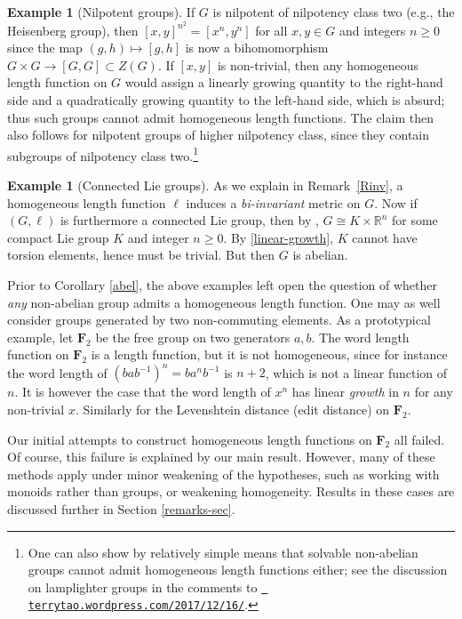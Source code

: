 \documentclass[11pt,a4paper,reqno]{amsart}
\numberwithin{equation}{section}
\theoremstyle{plain}
\theoremstyle{definition}
\newtheorem{example}[equation]{Example}
\newcommand\R{\mathbb{R}}
\newcommand\normsymb{\ell}  %
\newcommand\free[1]{\mathbf{F}_{#1}}
\begin{document}
\begin{example}[Nilpotent groups]
If $G$ is nilpotent of nilpotency class two (e.g., the Heisenberg group),
then $[x,y]^{n^2} = [x^n,y^n]$ for all $x,y \in G$ and integers $n \geq
0$ since the map $(g,h) \mapsto [g,h]$ is now a bihomomorphism
$G \times G \to [G,G] \subset Z(G)$.
If $[x,y]$ is non-trivial, then any homogeneous length function on $G$
would assign a linearly growing quantity to the right-hand side and a
quadratically growing quantity to the left-hand side, which is absurd;
thus such groups cannot admit homogeneous length functions.  The claim
then also follows for nilpotent groups of higher nilpotency class, since
they contain subgroups of nilpotency class two.\footnote{One can also
show by relatively simple means that solvable non-abelian groups cannot
admit homogeneous length functions either; see the discussion on
lamplighter groups in the comments to
\href{https://terrytao.wordpress.com/2017/12/16/bi-invariant-metrics-of-linear-growth-on-the-free-group/}{\tt
terrytao.wordpress.com/2017/12/16/}.}
\end{example}


\begin{example}[Connected Lie groups]
As we explain in Remark~\ref{Rinv}, a homogeneous length function
$\normsymb$ induces a \textit{bi-invariant} metric on $G$.
Now if $(G, \normsymb)$ is furthermore a connected Lie group, then by
\cite[Lemma 7.5]{Milnor}, $G \cong K \times \R^n$ for some compact Lie
group $K$ and integer $n \geq 0$. By \eqref{linear-growth}, $K$ cannot
have torsion elements, hence must be trivial. But then $G$ is abelian.
\end{example}

Prior to Corollary \ref{abel}, the above examples left open the question
of whether \textit{any} non-abelian group admits a homogeneous length
function. One may as well consider groups generated by two non-commuting
elements. As a prototypical example, let $\free{2}$ be the free group on
two generators $a,b$.  The word length function on $\free{2}$ is a length
function, but it is not homogeneous, since for instance the word length
of $(bab^{-1})^n = ba^n b^{-1}$ is $n+2$, which is not a linear function
of $n$.  It is however the case that the word length of $x^n$ has linear
\emph{growth} in $n$ for any non-trivial $x$. Similarly for the
Levenshtein distance (edit distance) on $\free{2}$.

Our initial attempts to construct homogeneous length functions on
$\free{2}$ all failed. Of course, this failure is explained by our main
result. However, many of these methods apply under minor weakening of the
hypotheses, such as working with monoids rather than groups, or weakening
homogeneity. Results in these cases are discussed further in Section
\ref{remarks-sec}.
\end{document}

